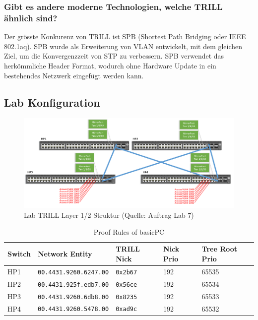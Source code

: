 \subsubsection{Gibt es andere moderne Technologien, welche TRILL ähnlich sind?}%
Der grösste Konkurenz von TRILL ist SPB (Shortest Path Bridging oder IEEE 802.1aq). SPB wurde als Erweiterung von VLAN entwickelt, mit dem gleichen Ziel, um die Konvergenzzeit von STP zu verbessern. SPB verwendet das herkömmliche Header Format, wodurch ohne Hardware Update in ein bestehendes Netzwerk eingefügt werden kann. 


\subsection{Lab Konfiguration}
\begin{figure}[H]
	\centering
	\includegraphics[width=1\linewidth]{images/trill_network_layer2}
	\caption{Lab TRILL Layer 1/2 Struktur (Quelle: Auftrag Lab 7)}
	\label{fig:trillnetworklayer2}
\end{figure}

\begin{table}[H]
	\centering
	\begin{tabu} to \linewidth {l l l l l}
		\toprule
		Switch & Network Entity & TRILL Nick & Nick Prio & Tree Root Prio \\
		\midrule
		HP1 & \lstinline|00.4431.9260.6247.00| & \lstinline|0x2b67| & 192 & 65535 \\
		HP2 & \lstinline|00.4431.925f.edb7.00| & \lstinline|0x56ce| & 192 & 65534 \\
		HP3 & \lstinline|00.4431.9260.6db8.00| & \lstinline|0x8235| & 192 & 65533 \\
		HP4 & \lstinline|00.4431.9260.5478.00| & \lstinline|0xad9c| & 192 & 65532 \\
		\bottomrule
	\end{tabu}
	\label{tbl:Lab devices}
	\caption{Proof Rules of basicPC}
\end{table}


